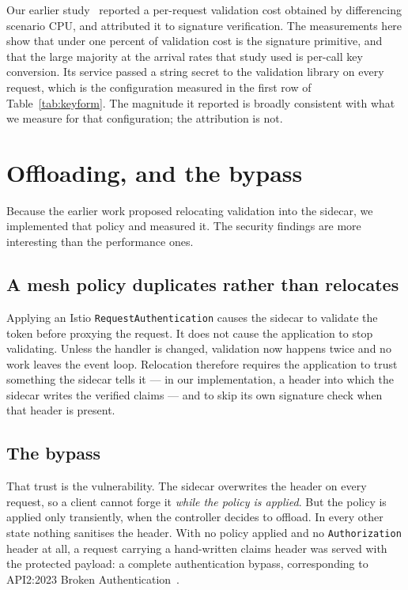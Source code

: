 \documentclass[pdflatex,sn-basic,twocolumn]{sn-jnl}
\begin{document}
Our earlier study~\cite{sikdar2026quantifying} reported a per-request validation
cost obtained by differencing scenario CPU, and attributed it to signature
verification. The measurements here show that under one percent of validation
cost is the signature primitive, and that the large majority at the arrival
rates that study used is per-call key conversion. Its service passed a string
secret to the validation library on every request, which is the configuration
measured in the first row of Table~\ref{tab:keyform}. The magnitude it reported
is broadly consistent with what we measure for that configuration; the
attribution is not.

\section{Offloading, and the bypass}\label{sec:offload}

Because the earlier work proposed relocating validation into the sidecar, we
implemented that policy and measured it. The security findings are more
interesting than the performance ones.

\subsection{A mesh policy duplicates rather than relocates}

Applying an Istio \texttt{RequestAuthentication} causes the sidecar to validate
the token before proxying the request. It does not cause the application to stop
validating. Unless the handler is changed, validation now happens twice and no
work leaves the event loop. Relocation therefore requires the application to
trust something the sidecar tells it --- in our implementation, a header into
which the sidecar writes the verified claims --- and to skip its own signature
check when that header is present.

\subsection{The bypass}

That trust is the vulnerability. The sidecar overwrites the header on every
request, so a client cannot forge it \emph{while the policy is applied}. But the
policy is applied only transiently, when the controller decides to offload. In
every other state nothing sanitises the header. With no policy applied and no
\texttt{Authorization} header at all, a request carrying a hand-written claims
header was served with the protected payload: a complete authentication bypass,
corresponding to API2:2023 Broken Authentication~\cite{owasp2023api}.
\end{document}
